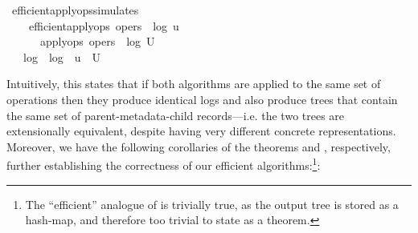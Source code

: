 \documentclass[sigconf]{acmart}
\renewenvironment{isabelle}{%
  \medbreak\noindent%
  \renewcommand{\isanewline}{\\}%
  \begin{minipage}{\columnwidth}%
  \begin{isabellebody}%
  \begin{tabbing}%
}{%
  \end{tabbing}%
  \end{isabellebody}%
  \end{minipage}%
  \medbreak%
}
\renewcommand{\isacartoucheopen}{}
\renewcommand{\isacartoucheclose}{}
\begin{document}
\begin{isabelle}
\isamarkupfalse%
\ efficient{\isacharunderscore}apply{\isacharunderscore}ops{\isacharunderscore}simulates{\isacharcolon}\isanewline
\ \ \ {}{\isacharcolon}\ {\isacartoucheopen}efficient{\isacharunderscore}apply{\isacharunderscore}ops\ opers\ {\isacharequal}\ {\isacharparenleft}log{}{\isacharcomma}\ u{\isacharparenright}{\isacartoucheclose}\isanewline
\ \ \ \ \ {}{\isacharcolon}\ {\isacartoucheopen}apply{\isacharunderscore}ops\ opers\ {\isacharequal}\ {\isacharparenleft}log{}{\isacharcomma}\ U{\isacharparenright}{\isacartoucheclose}\isanewline
\ \ \ {\isacartoucheopen}log{}\ {\isacharequal}\ log{}\ {\isasymand}\ u\ {\isasympreceq}\ U{\isacartoucheclose}
\end{isabelle}

Intuitively, this states that if both algorithms are applied to the same set of operations then they produce identical logs and also produce trees that contain the same set of parent-metadata-child records---i.e. the two trees are extensionally equivalent, despite having very different concrete representations.
Moreover, we have the following corollaries of the theorems  and , respectively, further establishing the correctness of our efficient algorithms:\footnote{The ``efficient'' analogue of  is trivially true, as the output tree is stored as a hash-map, and therefore too trivial to state as a theorem.}:
\end{document}
